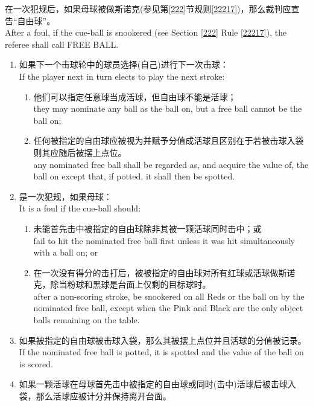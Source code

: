 \noindent 在一次犯规后，如果母球被做斯诺克(参见第\ref{222}节规则\ref{22217})，那么裁判应宣告``自由球''。\\
After a foul, if the cue-ball is snookered (see Section \ref{222} Rule \ref{22217}), the referee shall call FREE BALL.
\begin{enumerate}[label=(\alph*)]
    \item 如果下一个击球轮中的球员选择(自己)进行下一次击球：\\
    If the player next in turn elects to play the next stroke:
    \begin{enumerate}[label=(\roman*)]
        \item 他们可以指定任意球当成活球，但自由球不能是活球；\\
        they may nominate any ball as the ball on, but a free ball cannot be the ball on;
        \item 任何被指定的自由球应被视为并赋予分值成活球且区别在于若被击球入袋则其应随后被摆上点位。\\
        any nominated free ball shall be regarded as, and acquire the value of, the ball on except that, if potted, it shall then be spotted.
    \end{enumerate}
    \item \label{22312b}是一次犯规，如果母球：\\
    It is a foul if the cue-ball should:
    \begin{enumerate}[label=(\roman*)]
        \item 未能首先击中被指定的自由球除非其被一颗活球同时击中；或\\
        fail to hit the nominated free ball first unless it was hit simultaneously with a ball on; or
        \item \label{22312bii}在一次没有得分的击打后，被被指定的自由球对所有红球或活球做斯诺克，除当粉球和黑球是台面上仅剩的目标球时。\\
        after a non-scoring stroke, be snookered on all Reds or the ball on by the nominated free ball, except when the Pink and Black are the only object balls remaining on the table.
    \end{enumerate}
    \item 如果被指定的自由球被击球入袋，那么其被摆上点位并且活球的分值被记录。\\
    If the nominated free ball is potted, it is spotted and the value of the ball on is scored.
    \item 如果一颗活球在母球首先击中被指定的自由球或同时(击中)活球后被击球入袋，那么活球应被计分并保持离开台面。\\

\end{enumerate}
